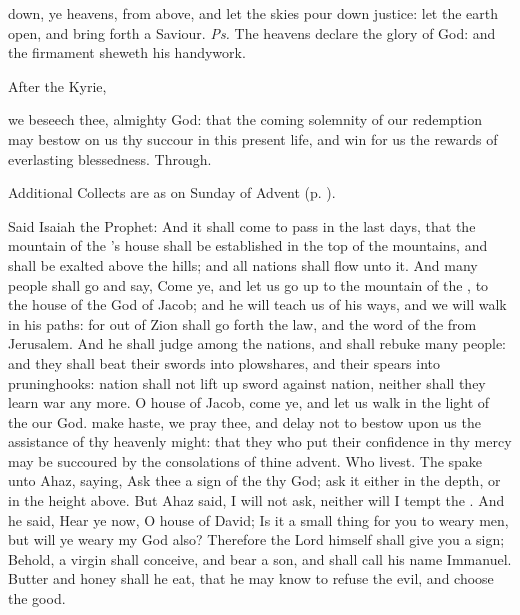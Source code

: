 
\introit
{} down, ye heavens, from above, and let the skies pour down justice: let the earth open, and bring forth a Saviour. \textit{Ps.} The heavens declare the glory of God: and the firmament sheweth his handywork.
\begin{rubric}
    After the Kyrie,
\end{rubric}
\collect
{} we beseech thee, almighty God: that the coming solemnity of our redemption may bestow on us thy succour in this present life, and win for us the rewards of everlasting blessedness. Through.
\begin{rubric}
    Additional Collects are as on  Sunday of Advent (p. \pageref{AdventI}).
\end{rubric}
 Said Isaiah the Prophet: And it shall come to pass in the last days, that the mountain of the 's house shall be established in the top of the mountains, and shall be exalted above the hills; and all nations shall flow unto it. And many people shall go and say, Come ye, and let us go up to the mountain of the , to the house of the God of Jacob; and he will teach us of his ways, and we will walk in his paths: for out of Zion shall go forth the law, and the word of the  from Jerusalem. And he shall judge among the nations, and shall rebuke many people: and they shall beat their swords into plowshares, and their spears into pruninghooks: nation shall not lift up sword against nation, neither shall they learn war any more. O house of Jacob, come ye, and let us walk in the light of the  our God. %
\collect
{} make haste, we pray thee, and delay not to bestow upon us the assistance of thy heavenly might: that they who put their confidence in thy mercy may be succoured by the consolations of thine advent. Who livest.
 The  spake unto Ahaz, saying, Ask thee a sign of the  thy God; ask it either in the depth, or in the height above. But Ahaz said, I will not ask, neither will I tempt the . And he said, Hear ye now, O house of David; Is it a small thing for you to weary men, but will ye weary my God also? Therefore the Lord himself shall give you a sign; Behold, a virgin shall conceive, and bear a son, and shall call his name Immanuel. Butter and honey shall he eat, that he may know to refuse the evil, and choose the good.

